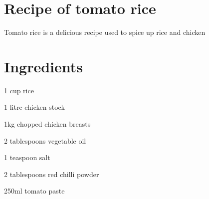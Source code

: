 \section { Recipe of tomato rice}
Tomato rice is a delicious recipe used to spice up rice and chicken
\section {Ingredients}
\begin {items}
\item 1 cup rice
\item 1 litre chicken stock
\item 1kg chopped chicken breasts
\item 2 tablespoons vegetable oil
\item 1 teaspoon salt
\item 2 tablespoons red chilli powder
\item 250ml tomato paste
\end {items}

